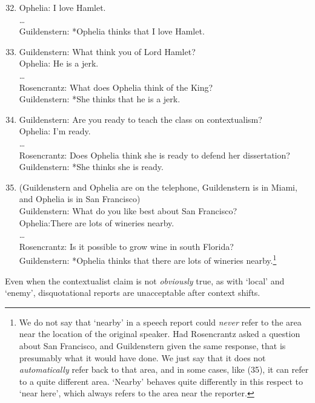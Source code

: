 \begin{enumerate}
\setcounter{enumi}{31} 
\item Ophelia: I love Hamlet. \\
{{\dots}} \\
Guildenstern: *Ophelia thinks that I love Hamlet. \\
\item Guildenstern: What think you of Lord Hamlet? \\
Ophelia: He is a jerk. \\
{{\dots}}  \\
Rosencrantz: What does Ophelia think of the King? \\
Guildenstern: *She thinks that he is a jerk. \\
\item Guildenstern: Are you ready to teach the class on contextualism? \\
Ophelia: I'm ready. \\
 {{\dots}}  \\
Rosencrantz: Does Ophelia think she is ready to defend her dissertation? \\
Guildenstern: *She thinks she is ready. \\
\item (Guildenstern and Ophelia are on the telephone, Guildenstern is in Miami, and Ophelia is in San Francisco) \\
Guildenstern: What do you like best about San Francisco? \\
Ophelia:There are lots of wineries nearby. \\
{{\dots}}  \\
Rosencrantz: Is it possible to grow wine in south Florida? \\
Guildenstern: *Ophelia thinks that there are lots of wineries nearby.\footnote{We do not say that `nearby' in a speech report could \textit{never} refer to the area near the location of the original speaker. Had Rosencrantz asked a question about San Francisco, and Guildenstern given the same response, that is presumably what it would have done. We just say that it does not \textit{automatically} refer back to that area, and in some cases, like (35), it can refer to a quite different area. `Nearby' behaves quite differently in this respect to `near here', which always refers to the area near the reporter.} 
\end{enumerate}

\noindent Even when the contextualist claim is not \textit{obviously} true, as with `local' and 
`enemy', disquotational reports are unacceptable after context shifts.
 
